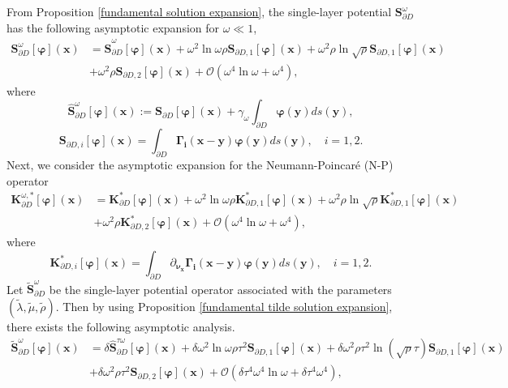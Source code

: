 \documentclass[10pt,reqno,oneside]{amsart}%
\theoremstyle{definition}
\theoremstyle{remark}
\numberwithin{equation}{section}
\numberwithin{equation}{section}
\begin{document}
From Proposition \ref{fundamental solution expansion}, the single-layer potential $\mathbf{S}_{\partial D}^{\omega}$ has the following asymptotic expansion for $\omega\ll 1$,
\begin{align}\label{singlelayer}
\mathbf{S}_{\partial D}^{\omega}[\boldsymbol{\varphi}](\mathbf{x})&=\hat{\mathbf{S}}_{\partial D}^{\omega}[\boldsymbol{\varphi}](\mathbf{x})
+\omega^2\ln\omega\rho\mathbf{S}_{\partial D,1}[\boldsymbol{\varphi}](\mathbf{x})
+\omega^2\rho\ln\sqrt{\rho}\mathbf{S}_{\partial D,1}[\boldsymbol{\varphi}](\mathbf{x})\nonumber\\
&+\omega^2\rho\mathbf{S}_{\partial D,2}[\boldsymbol{\varphi}](\mathbf{x})
+\mathcal{O}(\omega^4\ln{\omega}+\omega^4),
\end{align}
where
\begin{equation}\label{hats1}
\hat{\mathbf{S}}_{\partial D}^{\omega}[\boldsymbol{\varphi}](\mathbf{x}):=\mathbf{S}_{\partial D}[\boldsymbol{\varphi}](\mathbf{x})+\gamma_{\omega}\int_{\partial D}\boldsymbol{\varphi}(\mathbf{y})d s(\mathbf{y}),
\end{equation}
$$
\mathbf{S}_{\partial D,i}[\boldsymbol{\varphi}](\mathbf{x})=\int_{\partial D} \boldsymbol{\Gamma_i}(\mathbf{x}-\mathbf{y})\boldsymbol{\varphi}(\mathbf{y})d s(\mathbf{y}),\quad i=1,2.
$$
Next, we consider the asymptotic expansion for the Neumann-Poincar\'e (N-P) operator
\begin{align}\label{nplayer}
\mathbf{K}_{\partial D}^{\omega,*}[\boldsymbol{\varphi}](\mathbf{x})&=\mathbf{K}_{\partial D}^{*}[\boldsymbol{\varphi}](\mathbf{x})
+\omega^2\ln\omega\rho\mathbf{K}_{\partial D,1}^{*}[\boldsymbol{\varphi}](\mathbf{x})
+\omega^2\rho\ln\sqrt{\rho}\mathbf{K}_{\partial D,1}^{*}[\boldsymbol{\varphi}](\mathbf{x})\nonumber\\
&+\omega^2\rho\mathbf{K}_{\partial D,2}^{*}[\boldsymbol{\varphi}](\mathbf{x})+\mathcal{O}(\omega^4\ln{\omega}+\omega^4),
\end{align}
where
$$
\mathbf{K}_{\partial D,i}^{*}[\boldsymbol{\varphi}](\mathbf{x})=\int_{\partial D} \partial_{\boldsymbol{\nu}_{\mathbf{x}}} \boldsymbol{\Gamma_i}(\mathbf{x}-\mathbf{y})\boldsymbol{\varphi}(\mathbf{y})d s(\mathbf{y}),\quad i=1,2.
$$
Let $\tilde{\mathbf{S}}_{\partial D}^{\omega}$ be the single-layer potential operator associated with the parameters $(\tilde{\lambda}, \tilde{\mu},\tilde{\rho})$. Then by using Proposition \ref{fundamental tilde solution expansion}, there exists the following asymptotic analysis.
\begin{align}\label{tildesinglelayer}
\tilde{\mathbf{S}}_{\partial D}^{\omega}[\boldsymbol{\varphi}](\mathbf{x})&=\delta\hat{\mathbf{S}}_{\partial D}^{\tau\omega}[\boldsymbol{\varphi}](\mathbf{x})
+\delta\omega^2\ln\omega\rho\tau^2\mathbf{S}_{\partial D,1}[\boldsymbol{\varphi}](\mathbf{x})+\delta\omega^2\rho\tau^2 \ln(\sqrt{\rho}\tau)\mathbf{S}_{\partial D,1}[\boldsymbol{\varphi}](\mathbf{x})\nonumber\\
&+\delta\omega^2\rho\tau^2\mathbf{S}_{\partial D,2}[\boldsymbol{\varphi}](\mathbf{x})+\mathcal{O}(\delta\tau^4\omega^4\ln{\omega}+\delta\tau^4\omega^4),%
\end{align}
\end{document}
